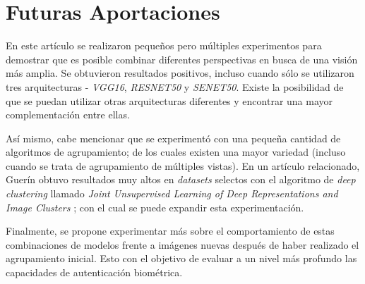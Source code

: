 \documentclass[letterpaper, 10 pt, conference]{ieeeconf}  %
\begin{document}
    \section{Futuras Aportaciones}
    En este artículo se realizaron pequeños pero múltiples experimentos para demostrar que es
    posible combinar diferentes perspectivas en busca de una visión más amplia. Se obtuvieron
    resultados positivos, incluso cuando sólo se utilizaron tres arquitecturas - \textit{VGG16},
    \textit{RESNET50} y \textit{SENET50}. Existe la posibilidad de que se puedan utilizar
    otras arquitecturas diferentes y encontrar una mayor complementación entre ellas.

    Así mismo, cabe mencionar que se experimentó con una pequeña cantidad de algoritmos de
    agrupamiento; de los cuales existen una mayor variedad (incluso cuando se trata de
    agrupamiento de múltiples vistas). En un artículo relacionado, Guerín obtuvo resultados
    muy altos en \textit{datasets} selectos con el algoritmo de \textit{deep clustering} llamado
    \textit{Joint Unsupervised Learning of Deep Representations and Image Clusters} \cite{JULE};
    con el cual se puede expandir esta experimentación.

    Finalmente, se propone experimentar más sobre el comportamiento de estas combinaciones de
    modelos frente a imágenes nuevas después de haber realizado el agrupamiento inicial. Esto
    con el objetivo de evaluar a un nivel más profundo las capacidades de autenticación biométrica.

\end{document}
